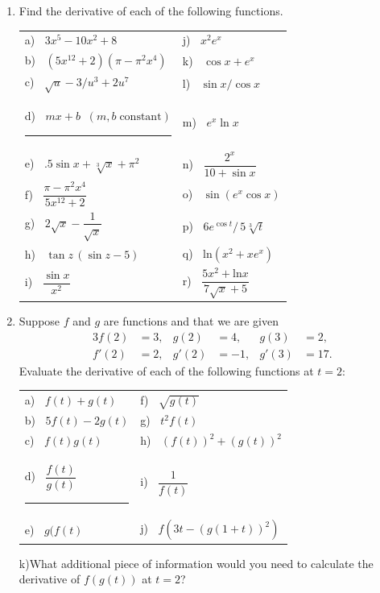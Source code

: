 \begin{enumerate}
\item Find the derivative of each of the following functions.




\begin {tabular}{ll}
a) $\;\; 3x^5 - 10x^2 + 8$  &  j) $\;\; x^2e^x$ \\
b) $\;\; (5x^{12} + 2)(\pi - {\pi}^2 x^4)$  & k) $\;\; \cos{x} + e^x$ \\
c) $\;\; \sqrt{u} - 3/u^3 + 2u^7$ 
	& l) $\;\;\sin{x}/ \cos{x}$ \\
d) $ \;\; mx + b \;\; (m,b \; \mbox{constant})$ \rule{30pt}{0pt}
	& m) $\;\;e^x \ln{x}$ \\
e) $ \;\; .5 \sin x + \sqrt[3]{x} + \pi^2$ 
	& n) $\;\; \dfrac{2^x}{10 + \sin{x}}$ \\
f) $\;\; \dfrac{{\pi - {\pi}^2 x^4}}{5x^{12} + 2}$  
	& o) $ \;\; \sin(e^x \cos x)$ \\
g) $ \;\;2\sqrt{x} - \dfrac{1}{\sqrt{x}}$ 
	& p) $ \;\; 6 e^{\cos t } / \, 5  \sqrt[3]{t}$ \\
h) $ \;\; \tan z \, (\sin z - 5)$ & q) $ \;\; \mbox{ln}(x^2 + x  e^x)$\\ [2pt]
i) $ \;\; \dfrac{\sin x}{x^2}$ & r) $\;\; \dfrac{5x^2 + \mbox{ln} x}{7 \sqrt{x} + 5}$ 
\end{tabular}

\item Suppose $f$ and $g$ are functions and that we are given
\begin{alignat*}{3}
f(2)  &= 3, &  g(2) &= 4, & g(3) &= 2,  \\
f'(2) &= 2, &      g'(2) &= -1, &    g'(3) &= 17.
\end{alignat*}
Evaluate the derivative of each of the following functions at $t=2$:



\begin {tabular}{ll}
a) $\;\; f(t) + g(t) $ &  f) $\;\; {\displaystyle \sqrt{g(t)}}$ \\
b) $\;\; 5f(t)-2g(t) $& g) $\;\; t^2f(t)$ \\
c) $\;\; f(t)g(t) $
	& h) $\;\;(f(t))^2+(g(t))^2$ \\ [2pt]
d) $ \;\; \dfrac{f(t)}{g(t)}$ \rule{70pt}{0pt}
	& i) $\;\;\dfrac{1}{f(t)}$ \\ [4pt]
e) $ \;\; g(f(t)$ 
	& j) $\;\;f(3t-(g(1+t))^2)$ \\
\end{tabular}

k)\enskip\thinspace What additional piece of information would you
need to calculate the derivative of $f(g(t))$ at $t=2$?




\end{enumerate}
